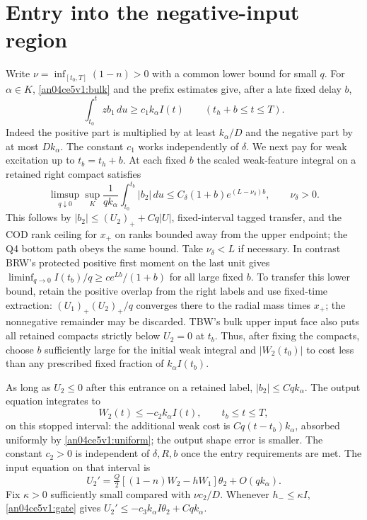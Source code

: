\documentclass[11pt]{article}
\begin{document}
\section{Entry into the negative-input region}\label{an04ce5v1:entry}
Write $\nu=\inf_{[t_0,T]}(1-n)>0$ with a common lower bound for small
$q$. For $\alpha\in K$, \eqref{an04ce5v1:bulk} and the prefix estimates give,
after a late fixed delay $b$,
\[
 \int_{t_0}^t z b_1\,du\ge c_1 k_\alpha I(t)
 \qquad(t_h+b\le t\le T).
\]
Indeed the positive part is multiplied by at least $k_\alpha/D$ and
the negative part by at most $D k_\alpha$. The constant $c_1$ works
independently of $\delta$. We next pay for weak excitation up to
$t_b=t_h+b$. At each fixed $b$ the scaled weak-feature integral on a
retained right compact satisfies
\[
 \limsup_{q\downarrow0}\sup_K
 \frac{1}{q k_\alpha}\int_{t_0}^{t_b}|b_2|\,du
 \le C_\delta(1+b)e^{(L-\nu_\delta)b},\qquad \nu_\delta>0.
\]
This follows by $|b_2|\le (U_2)_++Cq|U|$, fixed-interval tagged
transfer, and the COD rank ceiling for $x_+$ on ranks bounded away from
the upper endpoint; the Q4 bottom path obeys the same bound. Take
$\nu_\delta<L$ if necessary. In contrast BRW's protected positive
first moment on the last unit gives
$\liminf_{q\to0} I(t_b)/q\ge c e^{Lb}/(1+b)$ for all large fixed $b$.
To transfer this lower bound, retain the positive overlap from the
right labels and use fixed-time extraction:
$(U_1)_+(U_2)_+/q$ converges there to the radial mass times $x_+$;
the nonnegative remainder may be discarded. TBW's bulk upper input
face also puts all retained compacts strictly below $U_2=0$ at $t_b$.
Thus, after fixing the compacts, choose $b$ sufficiently large for
the initial weak integral and $|W_2(t_0)|$ to cost less than any
prescribed fixed fraction of $k_\alpha I(t_b)$.

As long as $U_2\le0$ after this entrance on a retained label,
$|b_2|\le Cq k_\alpha$. The output equation integrates to
\begin{equation}
 W_2(t)\le -c_2 k_\alpha I(t),\qquad t_b\le t\le T,
 \label{an04ce5v1:wnegative}
\end{equation}
on this stopped interval: the additional weak cost is $Cq(t-t_b)k_\alpha$,
absorbed uniformly by \eqref{an04ce5v1:uniform}; the output shape error is
smaller. The constant $c_2>0$ is independent of $\delta,R,b$ once
the entry requirements are met. The input equation on that interval is
\begin{equation}
 U_2'=\tfrac Q2[(1-n)W_2-hW_1]\theta_2+O(qk_\alpha).
 \label{an04ce5v1:gate}
\end{equation}
Fix $\kappa>0$ sufficiently small compared with $\nu c_2/D$.
Whenever $h_-\le\kappa I$, \eqref{an04ce5v1:gate} gives
$U_2'\le-c_3 k_\alpha I\theta_2+Cq k_\alpha$.
\end{document}
